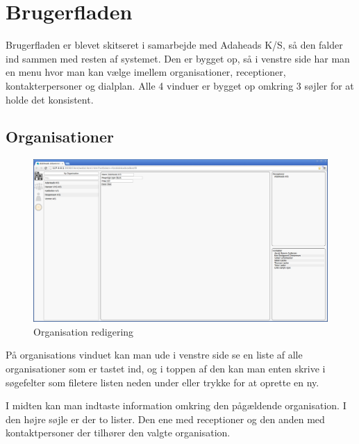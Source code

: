 \pagebreak
\section{Brugerfladen}
Brugerfladen er blevet skitseret i samarbejde med Adaheads K/S, så den falder ind sammen med resten af systemet.
Den er bygget op, så i venstre side har man en menu hvor man kan vælge imellem organisationer, receptioner, kontakterpersoner og dialplan. Alle 4 vinduer er bygget op omkring 3 søjler for at holde det konsistent.

\subsection{Organisationer}
\begin{figure}[ht!]
\centering
\includegraphics[width=\textwidth]{images/screen_org.png}
\caption{Organisation redigering}
\label{fig:screenorg}
\end{figure}
På organisations vinduet kan man ude i venstre side se en liste af alle organisationer som er tastet ind, og i toppen af den kan man enten skrive i søgefelter som filetere listen neden under eller trykke for at oprette en ny. 

I midten kan man indtaste information omkring den pågældende organisation. I den højre søjle er der to lister. Den ene med receptioner og den anden med kontaktpersoner der tilhører den valgte organisation.

\pagebreak
